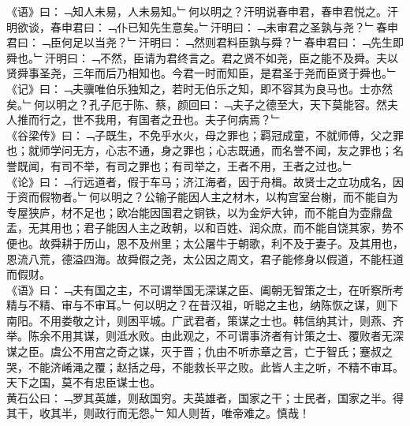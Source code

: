 《语》曰：﹁知人未易，人未易知。﹂何以明之？汗明说春申君，春申君悦之。汗明欲谈，春申君曰：﹁仆已知先生意矣。﹂汗明曰：﹁未审君之圣孰与尧？﹂春申君曰：﹁臣何足以当尧？﹂汗明曰：﹁然则君料臣孰与舜？﹂春申君曰：﹁先生即舜也。﹂汗明曰：﹁不然，臣请为君终言之。君之贤不如尧，臣之能不及舜。夫以贤舜事圣尧，三年而后乃相知也。今君一时而知臣，是君圣于尧而臣贤于舜也。﹂\\
《记》曰：﹁夫骥唯伯乐独知之，若时无伯乐之知，即不容其为良马也。士亦然矣。﹂何以明之？孔子厄于陈、蔡，颜回曰：﹁夫子之德至大，天下莫能容。然夫人推而行之，世不我用，有国者之丑也。夫子何病焉？﹂\\
《谷梁传》曰：﹁子既生，不免乎水火，母之罪也；羁冠成童，不就师傅，父之罪也；就师学问无方，心志不通，身之罪也；心志既通，而名誉不闻，友之罪也；名誉既闻，有司不举，有司之罪也；有司举之，王者不用，王者之过也。﹂\\
《论》曰：﹁行远道者，假于车马；济江海者，因于舟楫。故贤士之立功成名，因于资而假物者。﹂何以明之？公输子能因人主之材木，以构宫室台榭，而不能自为专屋狭庐，材不足也；欧冶能因国君之铜铁，以为金炉大钟，而不能自为壶鼎盘盂，无其用也；君子能因人主之政朝，以和百姓、润众庶，而不能自饶其家，势不便也。故舜耕于历山，恩不及州里；太公屠牛于朝歌，利不及于妻子。及其用也，恩流八荒，德溢四海。故舜假之尧，太公因之周文，君子能修身以假道，不能枉道而假财。
\\
《语》曰：﹁夫有国之主，不可谓举国无深谋之臣、阖朝无智策之士，在听察所考精与不精、审与不审耳。﹂何以明之？在昔汉祖，听聪之主也，纳陈恢之谋，则下南阳。不用娄敬之计，则困平城。广武君者，策谋之士也。韩信纳其计，则燕、齐举。陈余不用其谋，则泜水败。由此观之，不可谓事济者有计策之士、覆败者无深谋之臣。虞公不用宫之奇之谋，灭于晋；仇由不听赤章之言，亡于智氏；蹇叔之哭，不能济崤渑之覆；赵括之母，不能救长平之败。此皆人主之听，不精不审耳。天下之国，莫不有忠臣谋士也。
\\
黄石公曰：﹁罗其英雄，则敌国穷。夫英雄者，国家之干；士民者，国家之半。得其干，收其半，则政行而无怨。﹂知人则哲，唯帝难之。慎哉！
%
%
